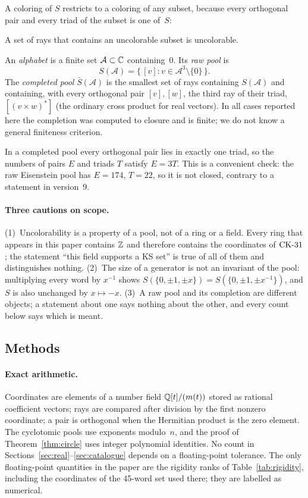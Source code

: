 A coloring of $S$ restricts to a coloring of any subset, because every orthogonal pair and every
triad of the subset is one of~$S$:

\begin{lemma}[Restriction]\label{lem:restrict}
A set of rays that contains an uncolorable subset is uncolorable.
\end{lemma}

\begin{definition}
An \emph{alphabet} is a finite set $\mathcal A\subset\mathbb{C}$ containing~0.  Its \emph{raw pool} is
\[
S(\mathcal A)=\{\,[v]: v\in\mathcal A^3\setminus\{0\}\,\}.
\]
The \emph{completed pool} $\bar S(\mathcal A)$ is the smallest set of rays containing
$S(\mathcal A)$ and containing, with every orthogonal pair $[v],[w]$, the third ray of their
triad, $[(v\times w)^{*}]$ (the ordinary cross product for real vectors).  In all cases reported
here the completion was computed to closure and is finite; we do not know a general finiteness
criterion.
\end{definition}

In a completed pool every orthogonal pair lies in exactly one triad, so the numbers of pairs $E$
and triads $T$ satisfy $E=3T$.  This is a convenient check: the raw Eisenstein pool has
$E=174$, $T=22$, so it is not closed, contrary to a statement in version~9.

\paragraph{Three cautions on scope.}
(1)~Uncolorability is a property of a pool, not of a ring or a field.  Every ring that appears in
this paper contains $\mathbb{Z}$ and therefore contains the coordinates of $\mathrm{CK}\text{-}31$; the statement ``this
field supports a KS set'' is true of all of them and distinguishes nothing.  (2)~The size of a
generator is not an invariant of the pool: multiplying every word by $x^{-1}$ shows
$S(\{0,\pm1,\pm x\})=S(\{0,\pm1,\pm x^{-1}\})$, and $S$ is also unchanged by $x\mapsto-x$.
(3)~A raw pool and its completion are different objects; a statement about one says nothing about
the other, and every count below says which is meant.

\subsection{Methods}\label{sec:methods}

\paragraph{Exact arithmetic.}  Coordinates are elements of a number field $\mathbb{Q}[t]/(m(t))$ stored
as rational coefficient vectors; rays are compared after division by the first nonzero
coordinate; a pair is orthogonal when the Hermitian product is the zero element.  The
cyclotomic pools use exponents modulo~$n$, and the proof of Theorem~\ref{thm:circle} uses
integer polynomial identities.  No count in Sections~\ref{sec:real}--\ref{sec:catalogue} depends
on a floating-point tolerance.  The only floating-point quantities in the paper are the rigidity ranks of
Table~\ref{tab:rigidity}, including the coordinates of the 45-word set used there; they are
labelled as numerical.

